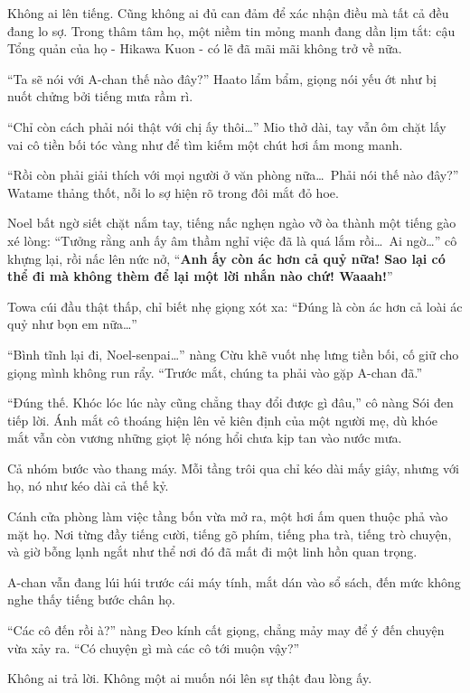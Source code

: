 \documentclass[../main.tex]{subfiles}
\begin{document}
Không ai lên tiếng. Cũng không ai đủ can đảm để xác nhận điều mà tất cả đều đang lo sợ. Trong thâm tâm họ, một niềm tin mỏng manh đang dần lịm tắt: cậu Tổng quản của họ - Hikawa Kuon - có lẽ đã mãi mãi không trở về nữa.

``Ta sẽ nói với A-chan thế nào đây?'' Haato lẩm bẩm, giọng nói yếu ớt như bị nuốt chửng bởi tiếng mưa rầm rì.

``Chỉ còn cách phải nói thật với chị ấy thôi\dots'' Mio thở dài, tay vẫn ôm chặt lấy vai cô tiền bối tóc vàng như để tìm kiếm một chút hơi ấm mong manh.

``Rồi còn phải giải thích với mọi người ở văn phòng nữa\dots\ Phải nói thế nào đây?'' Watame thảng thốt, nỗi lo sợ hiện rõ trong đôi mắt đỏ hoe.

Noel bất ngờ siết chặt nắm tay, tiếng nấc nghẹn ngào vỡ òa thành một tiếng gào xé lòng: ``Tưởng rằng anh ấy âm thầm nghỉ việc đã là quá lắm rồi\dots\ Ai ngờ\dots'' cô khựng lại, rồi nấc lên nức nở, ``\textbf{Anh ấy còn ác hơn cả quỷ nữa! Sao lại có thể đi mà không thèm để lại một lời nhắn nào chứ! Waaah!}''

Towa cúi đầu thật thấp, chỉ biết nhẹ giọng xót xa: ``Đúng là còn ác hơn cả loài ác quỷ như bọn em nữa\dots''

``Bình tĩnh lại đi, Noel-senpai\dots'' nàng Cừu khẽ vuốt nhẹ lưng tiền bối, cố giữ cho giọng mình không run rẩy. ``Trước mắt, chúng ta phải vào gặp A-chan đã.''

``Đúng thế. Khóc lóc lúc này cũng chẳng thay đổi được gì đâu,'' cô nàng Sói đen tiếp lời. Ánh mắt cô thoáng hiện lên vẻ kiên định của một người mẹ, dù khóe mắt vẫn còn vương những giọt lệ nóng hổi chưa kịp tan vào nước mưa.

\ct

Cả nhóm bước vào thang máy. Mỗi tầng trôi qua chỉ kéo dài mấy giây, nhưng với họ, nó như kéo dài cả thế kỷ.

Cánh cửa phòng làm việc tầng bốn vừa mở ra, một hơi ấm quen thuộc phả vào mặt họ. Nơi từng đầy tiếng cười, tiếng gõ phím, tiếng pha trà, tiếng trò chuyện, và giờ bỗng lạnh ngắt như thể nơi đó đã mất đi một linh hồn quan trọng.

A-chan vẫn đang lúi húi trước cái máy tính, mắt dán vào sổ sách, đến mức không nghe thấy tiếng bước chân họ.

``Các cô đến rồi à?'' nàng Đeo kính cất giọng, chẳng mảy may để ý đến chuyện vừa xảy ra. ``Có chuyện gì mà các cô tới muộn vậy?''

Không ai trả lời. Không một ai muốn nói lên sự thật đau lòng ấy.
\end{document}
